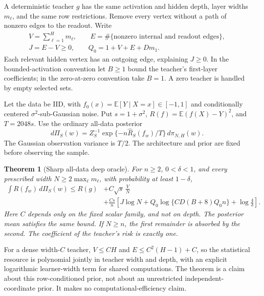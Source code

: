 \documentclass[11pt]{article}
\newtheorem{theorem}{Theorem}[section]
\newcommand{\E}{\mathbb E}
\begin{document}
A deterministic teacher $g$ has the same activation and hidden depth, layer widths $m_\ell$, and the same row restrictions. Remove every vertex without a path of nonzero edges to the readout. Write
\[
 \begin{gathered}
 V=\sum_{\ell=1}^H m_\ell,\qquad
 E=\#\{\text{nonzero internal and readout edges}\},\\
 J=E-V\ge0,\qquad Q_0=1+V+E+Dm_1.
 \end{gathered}
\]
Each relevant hidden vertex has an outgoing edge, explaining $J\ge0$. In the bounded-activation convention let $B\ge1$ bound the teacher's first-layer coefficients; in the zero-at-zero convention take $B=1$. A zero teacher is handled by empty selected sets.

Let the data be IID, with $f_0(x)=\E[Y\mid X=x]\in[-1,1]$ and conditionally centered $\sigma^2$-sub-Gaussian noise. Put $s=1+\sigma^2$, $R(f)=\E(f(X)-Y)^2$, and $T=2048s$. Use the ordinary all-data posterior
\[
 d\Pi_S(w)=Z_S^{-1}\exp\{-n\widehat R_S(f_w)/T\}\,d\pi_{N,H}(w).
\]
The Gaussian observation variance is $T/2$. The architecture and prior are fixed before observing the sample.

\begin{theorem}[Sharp all-data deep oracle]
\label{thm:main}
For $n\ge2$, $0<\delta<1$, and every prescribed width $N\ge2\max_\ell m_\ell$, with probability at least $1-\delta$,
\[
 \begin{aligned}
 \int R(f_w)\,d\Pi_S(w)\le R(g)
 &+C\sqrt{s}\,\frac VN\\
 &+\frac{Cs}{n}\left[J\log N+
 Q_0\log\{CD(B+8)Q_0n\}+\log\frac4\delta\right].
 \end{aligned}
\]
Here $C$ depends only on the fixed scalar family, and not on depth. The posterior mean satisfies the same bound. If $N\ge n$, the first remainder is absorbed by the second. The coefficient of the teacher's risk is exactly one.
\end{theorem}

For a dense width-$C$ teacher, $V\le CH$ and $E\le C^2(H-1)+C$, so the statistical resource is polynomial jointly in teacher width and depth, with an explicit logarithmic learner-width term for shared computations. The theorem is a claim about this row-conditioned prior, not about an unrestricted independent-coordinate prior. It makes no computational-efficiency claim.



\end{document}
